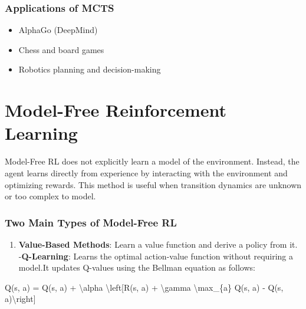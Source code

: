 \documentclass[
]{book}
\newenvironment{Shaded}{\begin{snugshade}}{\end{snugshade}}
\newcommand{\NormalTok}[1]{#1}
\providecommand{\tightlist}{%
  \setlength{\itemsep}{0pt}\setlength{\parskip}{0pt}}
\begin{document}
\subsection{\texorpdfstring{\textbf{Applications of MCTS}}{Applications of MCTS}}\label{applications-of-mcts}

\begin{itemize}
\tightlist
\item
  AlphaGo (DeepMind)
\item
  Chess and board games
\item
  Robotics planning and decision-making
\end{itemize}

\chapter{\texorpdfstring{\textbf{Model-Free Reinforcement Learning}}{Model-Free Reinforcement Learning}}\label{model-free-reinforcement-learning}

Model-Free RL does not explicitly learn a model of the environment. Instead, the agent learns directly from experience by interacting with the environment and optimizing rewards. This method is useful when transition dynamics are unknown or too complex to model.

\subsection{\texorpdfstring{\textbf{Two Main Types of Model-Free RL}}{Two Main Types of Model-Free RL}}\label{two-main-types-of-model-free-rl}

\begin{enumerate}
\def\labelenumi{\arabic{enumi}.}
\tightlist
\item
  \textbf{Value-Based Methods}: Learn a value function and derive a policy from it.
  -\textbf{Q-Learning}: Learns the optimal action-value function without requiring a model.It updates Q-values using the Bellman equation as follows:
\end{enumerate}

\begin{Shaded}
\begin{Highlighting}[]
\NormalTok{Q(s, a) = Q(s, a) + \textbackslash{}alpha \textbackslash{}left[R(s, a) + \textbackslash{}gamma \textbackslash{}max\_\{a\textquotesingle{}\} Q(s\textquotesingle{}, a\textquotesingle{}) {-} Q(s, a)\textbackslash{}right]}
\end{Highlighting}
\end{Shaded}
\end{document}

